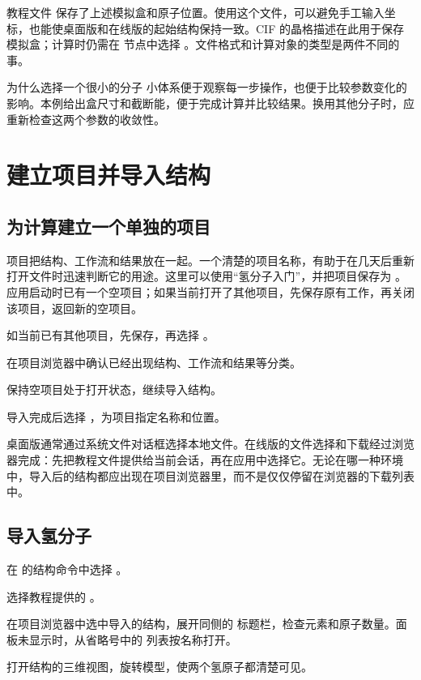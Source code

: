 教程文件  保存了上述模拟盒和原子位置。使用这个文件，可以避免手工输入坐标，也能使桌面版和在线版的起始结构保持一致。CIF 的晶格描述在此用于保存模拟盒；计算时仍需在  节点中选择 。文件格式和计算对象的类型是两件不同的事。

\begin{notebox}{为什么选择一个很小的分子}
小体系便于观察每一步操作，也便于比较参数变化的影响。本例给出盒尺寸和截断能，便于完成计算并比较结果。换用其他分子时，应重新检查这两个参数的收敛性。
\end{notebox}

\section{建立项目并导入结构}

\subsection{为计算建立一个单独的项目}

项目把结构、工作流和结果放在一起。一个清楚的项目名称，有助于在几天后重新打开文件时迅速判断它的用途。这里可以使用“氢分子入门”，并把项目保存为 。应用启动时已有一个空项目；如果当前打开了其他项目，先保存原有工作，再关闭该项目，返回新的空项目。

\begin{steps}
\item 如当前已有其他项目，先保存，再选择 。
\item 在项目浏览器中确认已经出现结构、工作流和结果等分类。
\item 保持空项目处于打开状态，继续导入结构。
\item 导入完成后选择 ，为项目指定名称和位置。
\end{steps}

桌面版通常通过系统文件对话框选择本地文件。在线版的文件选择和下载经过浏览器完成：先把教程文件提供给当前会话，再在应用中选择它。无论在哪一种环境中，导入后的结构都应出现在项目浏览器里，而不是仅仅停留在浏览器的下载列表中。

\subsection{导入氢分子}

\begin{steps}
\item 在  的结构命令中选择 。
\item 选择教程提供的 。
\item 在项目浏览器中选中导入的结构，展开同侧的  标题栏，检查元素和原子数量。面板未显示时，从省略号中的  列表按名称打开。
\item 打开结构的三维视图，旋转模型，使两个氢原子都清楚可见。
\end{steps}

